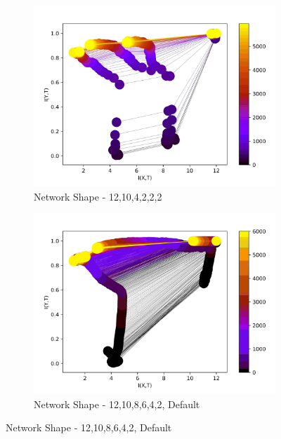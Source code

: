 \documentclass[dissertation.tex]{subfiles}
\begin{document}
\begin{figure}[ht]
  \centering
  \begin{subfigure}[t]{0.32\textwidth}
    \centering
    \includegraphics[width=\textwidth]{figs/eval/networkShape/Binning10,4,2,2.jpg}
    \caption{
      Network Shape - 12,10,4,2,2,2
    }
    \label{figNetworkShapeDefault}
  \end{subfigure}
  \hfill
  \begin{subfigure}[t]{0.32\textwidth}
    \centering
    \includegraphics[width=\textwidth]{figs/eval/networkShape/Binning10,8,6,4.jpg}
    \caption{
      Network Shape - 12,10,8,6,4,2, Default
    }
    \label{figNetworkShape2}
  \end{subfigure}

\end{figure}
\end{document}
